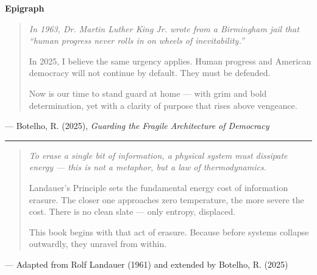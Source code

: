 \begin{flushleft}
\vspace*{1cm}
\textbf{\large Epigraph}

\vspace{1.5em}
\begin{quote}\raggedright\itshape
In 1963, Dr. Martin Luther King Jr. wrote from a Birmingham jail that “human progress never rolls in on wheels of inevitability.”

In 2025, I believe the same urgency applies. Human progress and American democracy will not continue by default. They must be defended.

Now is our time to stand guard at home — with grim and bold determination, yet with a clarity of purpose that rises above vengeance.
\end{quote}
\hfill --- Botelho, R. (2025), \textit{Guarding the Fragile Architecture of Democracy}

\vspace{2em}
\hrule
\vspace{1em}

\begin{quote}\raggedright\itshape
To erase a single bit of information, a physical system must dissipate energy — this is not a metaphor, but a law of thermodynamics.

Landauer’s Principle sets the fundamental energy cost of information erasure. The closer one approaches zero temperature, the more severe the cost. There is no clean slate — only entropy, displaced.

This book begins with that act of erasure. Because before systems collapse outwardly, they unravel from within.
\end{quote}
\hfill --- Adapted from Rolf Landauer (1961) and extended by Botelho, R. (2025)
\end{flushleft}

